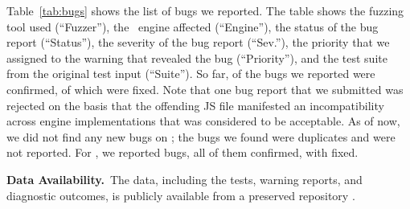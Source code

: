 \documentclass[smallextended]{svjour3}
\begin{document}
Table~\ref{tab:bugs} shows the list of bugs we reported. The table
shows the fuzzing tool used
(``Fuzzer''), the \js\ engine affected (``Engine''), the status of the
bug report (``Status''), the severity of the bug report (``Sev.''), the priority
that we assigned to the warning that revealed the bug (``Priority''),
and the test suite from the original test input (``Suite''). So far,
\noDiffConfirmed{} of the bugs we reported were confirmed, \noDiffFixed{} of which
were fixed. Note that one bug report that we submitted was rejected on
the basis that the offending JS file manifested an incompatibility
across engine implementations that was considered to be acceptable. As
of now, we did not find any new bugs on \smonkey{}; the bugs we found
were duplicates and were not reported. For \veight{},
we reported \noDiffVeight{} bugs,
all of them confirmed, with \noDiffVeightFixed{} fixed.





\begin{center}
\end{center}

\noindent
\textbf{Data Availability.}~The data, including the tests, warning
reports, and diagnostic outcomes, is publicly available from a
preserved repository \dataRepo.
\end{document}
